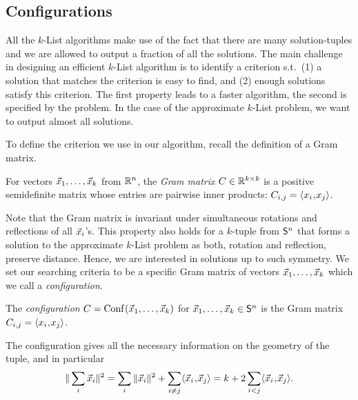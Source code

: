\subsection{Configurations} \label{subsec:ConfigL2}

All the $k$-List algorithms make use of the fact that there are many solution-tuples and we are allowed to output a fraction of all the solutions. 
The main challenge in designing an efficient $k$-List algorithm is to identify a criterion s.t.\ (1) a solution that matches the criterion is easy to find, and (2) enough solutions satisfy this criterion.  The first property leads to a faster algorithm, the second is specified by the problem. In the case of the approximate $k$-List problem, we want to output almost all solutions.

To define the criterion we use in our algorithm, recall the definition of a Gram matrix.

\begin{definition}
 For vectors $\vec x_1, \ldots, \vec x_k$ from ${{\mathbb R}}^n$, the \emph{Gram matrix} $C \in {{\mathbb R}}^{k \times k}$ is a positive semidefinite matrix whose entries are pairwise inner products: $C_{i, j} = \langle x_i\!\mathbin{,}\!x_j\rangle$.
\end{definition}  

Note that the Gram matrix is invariant under simultaneous rotations and reflections of all $\vec x_i$'s. This property also holds for a $k$-tuple from $\mathsf{S}^{n}$ that forms a solution to the approximate $k$-List problem as both, rotation and reflection, preserve distance. Hence, we are interested in solutions up to such symmetry. We set our searching criteria to be a specific Gram matrix of vectors $\vec x_1, \ldots, \vec x_k$ which we call a \emph{configuration}. 

\begin{definition}[Configuration] \label{def:Configuration}
	The \emph{configuration} $C = \text{Conf}\mkern2mu(\vec x_1, \ldots, \vec x_k)$ for $\vec x_1, \ldots, \vec x_k \in \mathsf{S}^{n}$ is the Gram matrix $C_{i, j} = \langle x_i\!\mathbin{,}\!x_j\rangle$.
\end{definition}

The configuration gives all the necessary information on the geometry of the tuple, and in particular
\begin{equation} \label{eq:LengthOfSum}
 \| \sum_i \vec x_i \|^2 = \sum_i \| \vec x_i \|^2 + \sum_{i \neq j} \langle\vec x_i\!\mathbin{,}\!\vec x_j\rangle = k + 2 \sum_{i<j}\langle\vec x_i\!\mathbin{,}\!\vec x_j\rangle.
\end{equation}

